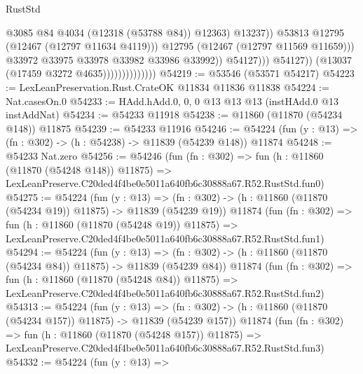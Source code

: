 \begin{lexlean}{RustStd}
\begin{coremodule}
                                                    @3085
                                                    @84
                                                    @4034
                                                    (@12318 (@53788 @84))
                                                    @12363)
                                                  @13237))
                                              @53813
                                              @12795
                                              (@12467 (@12797 @11634 @4119)))
                                            @12795
                                            (@12467 (@12797 @11569 @11659)))
                                          @33972
                                          @33975
                                          @33978
                                          @33982
                                          @33986
                                          @33992))
                                      @54127)))
                                @54127))
                            (@13037 (@17459 @3272 @4635))))))))))))))
@54219 := @53546 (@53571 @54217)
@54223 := LexLeanPreservation.Rust.CrateOK @11834 @11836 @11838
@54224 := Nat.casesOn.{0}
@54233 := HAdd.hAdd.{0, 0, 0} @13 @13 @13 (instHAdd.{0} @13 instAddNat)
@54234 := @54233 @11918
@54238 := @11860 (@11870 (@54234 @148)) @11875
@54239 := @54233 @11916
@54246 := @54224 (fun (y : @13) => (fn : @302) -> (h : @54238) -> @11839 (@54239 @148)) @11874
@54248 := @54233 Nat.zero
@54256 := @54246
    (fun (fn : @302) =>
    fun (h : @11860 (@11870 (@54248 @148)) @11875) =>
    LexLeanPreserve.C20ded4f4be0e5011a640fb6c30888a67.R52.RustStd.fun0)
@54275 := @54224
    (fun (y : @13) =>
    (fn : @302) -> (h : @11860 (@11870 (@54234 @19)) @11875) -> @11839 (@54239 @19))
    @11874
    (fun (fn : @302) =>
    fun (h : @11860 (@11870 (@54248 @19)) @11875) =>
    LexLeanPreserve.C20ded4f4be0e5011a640fb6c30888a67.R52.RustStd.fun1)
@54294 := @54224
    (fun (y : @13) =>
    (fn : @302) -> (h : @11860 (@11870 (@54234 @84)) @11875) -> @11839 (@54239 @84))
    @11874
    (fun (fn : @302) =>
    fun (h : @11860 (@11870 (@54248 @84)) @11875) =>
    LexLeanPreserve.C20ded4f4be0e5011a640fb6c30888a67.R52.RustStd.fun2)
@54313 := @54224
    (fun (y : @13) =>
    (fn : @302) -> (h : @11860 (@11870 (@54234 @157)) @11875) -> @11839 (@54239 @157))
    @11874
    (fun (fn : @302) =>
    fun (h : @11860 (@11870 (@54248 @157)) @11875) =>
    LexLeanPreserve.C20ded4f4be0e5011a640fb6c30888a67.R52.RustStd.fun3)
@54332 := @54224
    (fun (y : @13) =>

\end{coremodule}
\end{lexlean}
